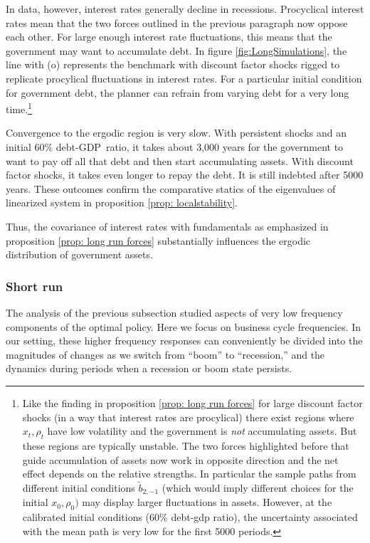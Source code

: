 \documentclass[thmsb,11pt]{article}
\begin{document}
In data, however, interest rates  generally decline in recessions. Procyclical interest rates mean that the
two forces outlined in the previous paragraph now oppose each other.  For  large enough interest rate fluctuations, this means that
the
government may want to accumulate debt. In figure \ref{fig:LongSimulations}, the
line with (o) represents the benchmark with discount factor shocks rigged to
replicate  procylical fluctuations in interest rates. For a particular initial condition for government debt,
the planner can refrain from varying debt for a very  long time.\footnote{Like the finding in proposition \ref{prop: long run forces} for large discount factor shocks (in a way that interest rates are procylical)  there exist
regions where $x_t,\rho_t$ have low volatility and the  government is \emph{not} accumulating assets. But these
regions  are typically unstable. The two forces highlighted before that guide accumulation of assets now work in opposite direction and the net effect depends
on the relative strengths. In particular the sample paths from different initial conditions $\tilde{b}_{2,-1}$ (which would imply different choices for the initial $x_0,\rho_0)$ may display larger fluctuations in assets. However, at the calibrated initial conditions ($60\%$ debt-gdp ratio), the uncertainty associated with the mean path is very low for the first 5000 periods.}


Convergence to the ergodic region is  very slow.  With persistent shocks and an initial 60\% debt-GDP\ ratio,  it takes about 3,000 years for
the government to want to pay off all that debt
and then start accumulating assets. With
discount factor shocks, it takes even longer to repay the debt. It is still indebted after 5000 years. These outcomes confirm the comparative statics of the eigenvalues of linearized system in proposition \ref{prop: localstability}.

Thus, the covariance of interest rates with fundamentals as emphasized in proposition \ref{prop: long run forces} substantially influences the ergodic distribution of government assets.

\subsubsection{Short run}

The analysis of the previous subsection studied  aspects of very low
frequency components of  the optimal policy. Here  we focus on business cycle frequencies.
 In our setting,  these higher frequency responses can conveniently be divided  into the magnitudes of changes as we switch from ``boom''
to ``recession,'' and the dynamics during  periods when a recession or boom state persists.
\end{document}
